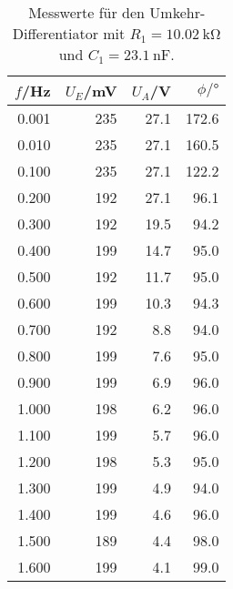 \begin{table}
  \centering
\begin{tabular}{rrrr}
    $f$/Hz &  $U_E$/mV &   $U_A$/V &  $\phi/\si{\degree}$ \\
\midrule
 0.001 &  235 &  27.1 &  172.6 \\
 0.010 &  235 &  27.1 &  160.5 \\
 0.100 &  235 &  27.1 &  122.2 \\
 0.200 &  192 &  27.1 &   96.1 \\
 0.300 &  192 &  19.5 &   94.2 \\
 0.400 &  199 &  14.7 &   95.0 \\
 0.500 &  192 &  11.7 &   95.0 \\
 0.600 &  199 &  10.3 &   94.3 \\
 0.700 &  192 &   8.8 &   94.0 \\
 0.800 &  199 &   7.6 &   95.0 \\
 0.900 &  199 &   6.9 &   96.0 \\
 1.000 &  198 &   6.2 &   96.0 \\
 1.100 &  199 &   5.7 &   96.0 \\
 1.200 &  198 &   5.3 &   95.0 \\
 1.300 &  199 &   4.9 &   94.0 \\
 1.400 &  199 &   4.6 &   96.0 \\
 1.500 &  189 &   4.4 &   98.0 \\
 1.600 &  199 &   4.1 &   99.0 \\
\end{tabular}
\caption{Messwerte für den Umkehr-Differentiator mit $R_1 = \SI{10.02}{\kilo\ohm}$ und $C_1 = \SI{23.1}{\nano\farad}$.}
\end{table}
